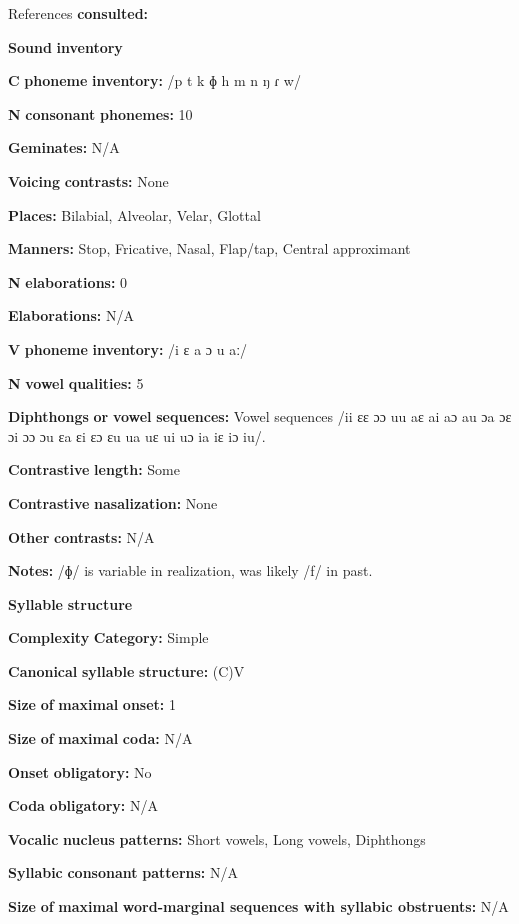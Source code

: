 References \textbf{consulted:} \citet{Bauer1999}

\textbf{Sound} \textbf{inventory}

\textbf{C} \textbf{phoneme} \textbf{inventory:} /p t k ɸ h m n ŋ ɾ w/

\textbf{N} \textbf{consonant} \textbf{phonemes:} 10

\textbf{Geminates:} N/A

\textbf{Voicing} \textbf{contrasts:} None

\textbf{Places:} Bilabial, Alveolar, Velar, Glottal

\textbf{Manners:} Stop, Fricative, Nasal, Flap/tap, Central approximant

\textbf{N} \textbf{elaborations:} 0

\textbf{Elaborations:} N/A

\textbf{V} \textbf{phoneme} \textbf{inventory:} /i ɛ a ɔ u aː/

\textbf{N} \textbf{vowel} \textbf{qualities:} 5

\textbf{Diphthongs} \textbf{or} \textbf{vowel} \textbf{sequences:} Vowel sequences /ii ɛɛ ɔɔ uu aɛ ai aɔ au ɔa ɔɛ ɔi ɔɔ ɔu ɛa ɛi ɛɔ ɛu ua uɛ ui uɔ ia iɛ iɔ iu/.

\textbf{Contrastive} \textbf{length:} Some

\textbf{Contrastive} \textbf{nasalization:} None

\textbf{Other} \textbf{contrasts:} N/A

\textbf{Notes:} /ɸ/ is variable in realization, was likely /f/ in past.

\textbf{Syllable} \textbf{structure}

\textbf{Complexity} \textbf{Category:} Simple

\textbf{Canonical} \textbf{syllable} \textbf{structure:} (C)V \citep[533-8]{Bauer1999}

\textbf{Size} \textbf{of} \textbf{maximal} \textbf{onset:} 1

\textbf{Size} \textbf{of} \textbf{maximal} \textbf{coda:} N/A

\textbf{Onset} \textbf{obligatory:} No

\textbf{Coda} \textbf{obligatory:} N/A

\textbf{Vocalic} \textbf{nucleus} \textbf{patterns:} Short vowels, Long vowels, Diphthongs

\textbf{Syllabic} \textbf{consonant} \textbf{patterns:} N/A

\textbf{Size} \textbf{of} \textbf{maximal} \textbf{word{}-marginal sequences with syllabic obstruents:} N/A

